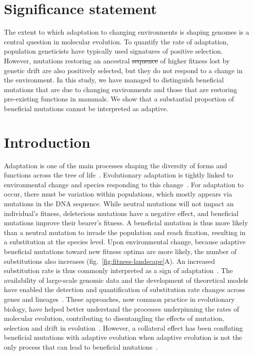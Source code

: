 \documentclass{article}
\providecommand{\DIFaddtex}[1]{{\protect\color{blue}\uwave{#1}}} %
\providecommand{\DIFdeltex}[1]{{\protect\color{red}\sout{#1}}}                      %
\providecommand{\DIFaddbegin}{} %
\providecommand{\DIFaddend}{} %
\providecommand{\DIFdelbegin}{} %
\providecommand{\DIFdelend}{} %
\providecommand{\DIFadd}[1]{\texorpdfstring{\DIFaddtex{#1}}{#1}} %
\providecommand{\DIFdel}[1]{\texorpdfstring{\DIFdeltex{#1}}{}} %
\newcommand{\DIFscaledelfig}{0.5}
\newlength{\DIFdelgraphicswidth} %
\newlength{\DIFdelgraphicsheight} %
\newcommand{\DIFaddincludegraphics}[2][]{{\color{blue}\fbox{\DIFOincludegraphics[#1]{#2}}}} %
\newcommand{\DIFdelincludegraphics}[2][]{%
\sbox{\DIFdelgraphicsbox}{\DIFOincludegraphics[#1]{#2}}%
\settoboxwidth{\DIFdelgraphicswidth}{\DIFdelgraphicsbox} %
\settoboxtotalheight{\DIFdelgraphicsheight}{\DIFdelgraphicsbox} %
\scalebox{\DIFscaledelfig}{%
\parbox[b]{\DIFdelgraphicswidth}{\usebox{\DIFdelgraphicsbox}\\[-\baselineskip] \rule{\DIFdelgraphicswidth}{0em}}\llap{\resizebox{\DIFdelgraphicswidth}{\DIFdelgraphicsheight}{%
\setlength{\unitlength}{\DIFdelgraphicswidth}%
\begin{picture}(1,1)%
\thicklines\linethickness{2pt} %
{\color[rgb]{1,0,0}\put(0,0){\framebox(1,1){}}}%
{\color[rgb]{1,0,0}\put(0,0){\line( 1,1){1}}}%
{\color[rgb]{1,0,0}\put(0,1){\line(1,-1){1}}}%
\end{picture}%
}\hspace*{3pt}}} %
} %
\DeclareRobustCommand{\DIFaddbegin}{\DIFOaddbegin \let\includegraphics\DIFaddincludegraphics} %
\DeclareRobustCommand{\DIFaddend}{\DIFOaddend \let\includegraphics\DIFOincludegraphics} %
\DeclareRobustCommand{\DIFdelbegin}{\DIFOdelbegin \let\includegraphics\DIFdelincludegraphics} %
\DeclareRobustCommand{\DIFdelend}{\DIFOaddend \let\includegraphics\DIFOincludegraphics} %
\begin{document}
    \section*{Significance statement}
    The extent to which adaptation to changing environments is shaping genomes is a central question in molecular evolution. To quantify the rate of adaptation, population geneticists have typically used signatures of positive selection. However, mutations restoring an ancestral \DIFdelbegin \DIFdel{sequence }\DIFdelend \DIFaddbegin \DIFadd{state }\DIFaddend of higher fitness lost by genetic drift are also positively selected, but they do not respond to a change in the environment. In this study, we have managed to distinguish beneficial mutations that are due to changing environments and those that are restoring pre-existing functions in mammals. We show that a substantial proportion of beneficial mutations cannot be interpreted as adaptive.

    \section*{Introduction}
    Adaptation is one of the main processes shaping the diversity of forms and functions across the tree of life~\cite{darwin_origin_1859}.
    Evolutionary adaptation is tightly linked to environmental change and species responding to this change~\cite{merrell_adaptive_1994, gavrilets_adaptive_2009}.
    For adaptation to occur, there must be variation within populations, which mostly appears via mutations in the DNA sequence.
    While neutral mutations will not impact an individual's fitness, deleterious mutations have a negative effect, and beneficial mutations improve their bearer's fitness.
    A beneficial mutation is thus more likely than a neutral mutation to invade the population and reach fixation, resulting in a substitution at the species level.
    Upon environmental change, because adaptive beneficial mutations toward new fitness optima are more likely, the number of substitutions also increases (fig.~\ref{fig:fitness-landscape}A).
    An increased substitution rate is thus commonly interpreted as a sign of adaptation~\cite{mcdonald_adaptative_1991, smith_adaptive_2002, welch_estimating_2006}.
    The availability of large-scale genomic data and the development of theoretical models have enabled the detection and quantification of substitution rate changes across genes and lineages~\cite{yang_statistical_2000, eyre-walker_genomic_2006, moutinho_variation_2019}.
    These approaches, now common practice in evolutionary biology, have helped better understand the processes underpinning the rates of molecular evolution, contributing to disentangling the effects of mutation, selection and drift in evolution~\cite{lynch_mutation_2023}.
    However, a collateral effect has been conflating beneficial mutations with adaptive evolution when adaptive evolution is not the only process that can lead to beneficial mutations~\cite{charlesworth_other_2007, mustonen_fitness_2009, jones_shifting_2017}.
\end{document}
